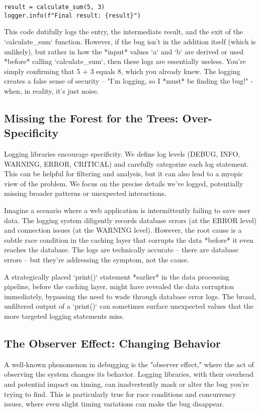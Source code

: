 \documentclass{article}
\begin{document}
{{{{\begin{verbatim}
result = calculate_sum(5, 3)
logger.info(f"Final result: {result}")
\end{verbatim}

This code dutifully logs the entry, the intermediate result, and the exit of the `calculate_sum` function. However, if the bug isn't in the addition itself (which is unlikely), but rather in how the *input* values `a` and `b` are derived or used *before* calling `calculate_sum`, then these logs are essentially useless. You're simply confirming that 5 + 3 equals 8, which you already knew.  The logging creates a false sense of security – "I'm logging, so I *must* be finding the bug!" - when, in reality, it's just noise.

\subsection*{Missing the Forest for the Trees: Over-Specificity}

Logging libraries encourage specificity. We define log levels (DEBUG, INFO, WARNING, ERROR, CRITICAL) and carefully categorize each log statement. This can be helpful for filtering and analysis, but it can also lead to a myopic view of the problem. We focus on the precise details we've logged, potentially missing broader patterns or unexpected interactions.

Imagine a scenario where a web application is intermittently failing to save user data. The logging system diligently records database errors (at the ERROR level) and connection issues (at the WARNING level). However, the root cause is a subtle race condition in the caching layer that corrupts the data *before* it even reaches the database. The logs are technically accurate – there are database errors – but they're addressing the symptom, not the cause.

A strategically placed `print()` statement *earlier* in the data processing pipeline, before the caching layer, might have revealed the data corruption immediately, bypassing the need to wade through database error logs. The broad, unfiltered output of a `print()` can sometimes surface unexpected values that the more targeted logging statements miss.

\subsection*{The Observer Effect: Changing Behavior}

A well-known phenomenon in debugging is the "observer effect," where the act of observing the system changes its behavior. Logging libraries, with their overhead and potential impact on timing, can inadvertently mask or alter the bug you're trying to find. This is particularly true for race conditions and concurrency issues, where even slight timing variations can make the bug disappear.

}}}}
\end{document}
